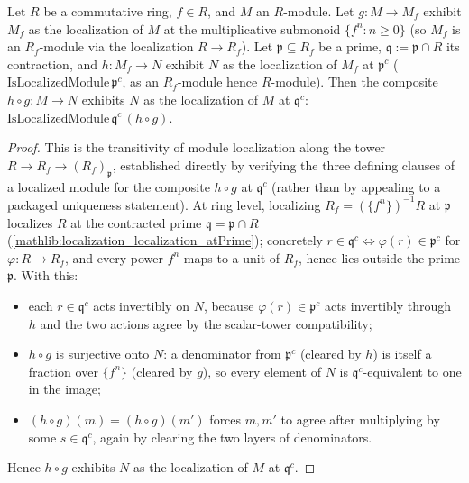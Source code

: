 \begin{lemma}
  \label{lem:tilde_pullback_stalk_localizationTransitivity}
  Let \(R\) be a commutative ring, \(f\in R\), and \(M\) an \(R\)-module.  Let
  \(g:M\to M_f\) exhibit \(M_f\) as the localization of \(M\) at the multiplicative
  submonoid \(\{f^n : n\geq 0\}\) (so \(M_f\) is an \(R_f\)-module via the
  localization \(R\to R_f\)).  Let \(\mathfrak p\subseteq R_f\) be a prime,
  \(\mathfrak q:=\mathfrak p\cap R\) its contraction, and \(h:M_f\to N\) exhibit \(N\)
  as the localization of \(M_f\) at \(\mathfrak p^{c}\) (\(\mathrm{IsLocalizedModule}\,
  \mathfrak p^{c}\), as an \(R_f\)-module hence \(R\)-module).  Then the composite
  \(h\circ g:M\to N\) exhibits \(N\) as the localization of \(M\) at \(\mathfrak q^{c}\):
  \(\mathrm{IsLocalizedModule}\,\mathfrak q^{c}\,(h\circ g)\).
\end{lemma}

\begin{proof}
  \leanok
  This is the transitivity of module localization along the tower
  \(R\to R_f\to(R_f)_{\mathfrak p}\), established directly by verifying the three
  defining clauses of a localized module for the composite \(h\circ g\) at
  \(\mathfrak q^{c}\) (rather than by appealing to a packaged uniqueness statement).
  At ring level, localizing \(R_f=(\{f^n\})^{-1}R\) at \(\mathfrak p\) localizes \(R\)
  at the contracted prime \(\mathfrak q=\mathfrak p\cap R\)
  (\cref{mathlib:localization_localization_atPrime}); concretely
  \(r\in\mathfrak q^{c}\iff\varphi(r)\in\mathfrak p^{c}\) for \(\varphi:R\to R_f\),
  and every power \(f^n\) maps to a unit of \(R_f\), hence lies outside the prime
  \(\mathfrak p\).  With this:
  \begin{itemize}
    \item each \(r\in\mathfrak q^{c}\) acts invertibly on \(N\), because
      \(\varphi(r)\in\mathfrak p^{c}\) acts invertibly through \(h\) and the two
      actions agree by the scalar-tower compatibility;
    \item \(h\circ g\) is surjective onto \(N\): a denominator from \(\mathfrak p^{c}\)
      (cleared by \(h\)) is itself a fraction over \(\{f^n\}\) (cleared by \(g\)), so
      every element of \(N\) is \(\mathfrak q^{c}\)-equivalent to one in the image;
    \item \((h\circ g)(m)=(h\circ g)(m')\) forces \(m,m'\) to agree after multiplying
      by some \(s\in\mathfrak q^{c}\), again by clearing the two layers of denominators.
  \end{itemize}
  Hence \(h\circ g\) exhibits \(N\) as the localization of \(M\) at \(\mathfrak q^{c}\).
\end{proof}

